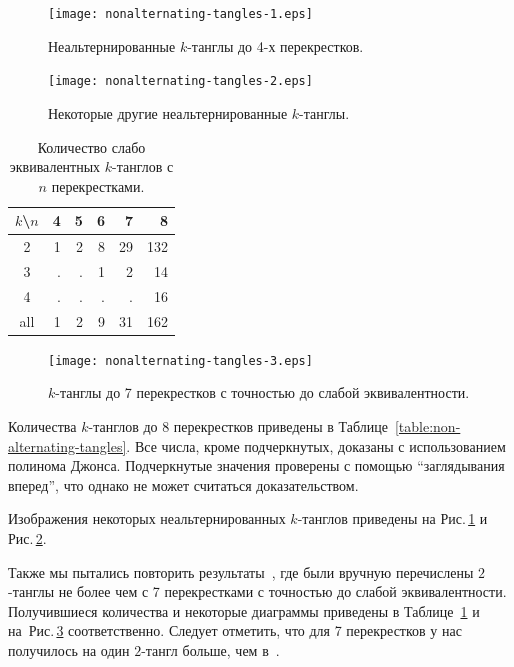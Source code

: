 \documentclass[12pt]{article}
\theoremstyle{plain}
\theoremstyle{definition}
\def\figureref#1{Рис.\,\protect\ref{#1}}
\begin{document}
		\begin{figure}[ht]
			\centering
			\texttt{[image: nonalternating-tangles-1.eps]}
			\caption{\footnotesize Неальтернированные $k$-танглы до 4-х перекрестков.\label{figure:nonalternating-tangles-4}}
		\end{figure}

		\begin{figure}[ht]
			\centering
			\texttt{[image: nonalternating-tangles-2.eps]}
			\caption{\footnotesize Некоторые другие неальтернированные $k$-танглы.\label{figure:nonalternating-tangles-rest}}
		\end{figure}

		\begin{table}[ht]
			\caption{Количество слабо эквивалентных $k$-танглов с $n$ перекрестками.\label{table:weak-tangles}}
			\centering
			\begin{tabular}{|c||r|r|r|r|r|}
			\hline
			$k$\textbackslash $n$
			    & 4 & 5 & 6 &  7 &   8 \\
			\hline\hline
			2   & 1 & 2 & 8 & 29 & 132 \\
			3   & . & . & 1 &  2 &  14 \\
			4   & . & . & . &  . &  16 \\
			\hline
			all & 1 & 2 & 9 & 31 & 162 \\
			\hline
			\end{tabular}
		\end{table}

		\begin{figure}[ht]
			\centering
			\texttt{[image: nonalternating-tangles-3.eps]}
			\caption{\footnotesize $k$-танглы до 7 перекрестков с точностью до слабой эквивалентности.\label{figure:weak-tangles-7}}
		\end{figure}

		Количества $k$-танглов до 8 перекрестков приведены в Таблице~\ref{table:non-alternating-tangles}. Все числа, кроме подчеркнутых,
		доказаны с использованием полинома Джонса. Подчеркнутые значения проверены с помощью ``заглядывания вперед'', что однако не
		может считаться доказательством.

		Изображения некоторых неальтернированных $k$-танглов приведены на \figureref{figure:nonalternating-tangles-4} и
		\figureref{figure:nonalternating-tangles-rest}.

		Также мы пытались повторить результаты~\cite{KanenobuSaitoSatoh2003}, где были вручную перечислены $2$-танглы не более чем
		с 7 перекрестками с точностью до слабой эквивалентности. Получившиеся количества и некоторые диаграммы приведены в
		Таблице~\ref{table:weak-tangles} и на~\figureref{figure:weak-tangles-7} соответственно. Следует отметить, что для 7
		перекрестков у нас получилось на один $2$-тангл больше, чем в~\cite{KanenobuSaitoSatoh2003}.
\end{document}
